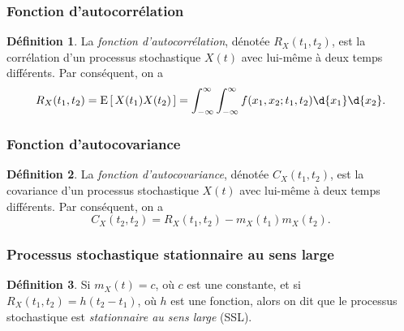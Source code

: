\documentclass[11pt]{article}
\makeatletter
\newcommand\Esp[1]{%
	\ensuremath{%
		\mathrm{E}\left[\,#1\,\right]%
	}%
}%
\theoremstyle{remark}
\theoremstyle{definition}
\newtheorem*{@definition}{Définition}
\newenvironment{definition}{%
	\begin{@definition}%
}{%
	\end{@definition}%
	\setcounter{property}{0}%
}
\makeatother
\begin{document}
\subsubsection{Fonction d'autocorrélation}
\begin{definition}
	La \textit{fonction d'autocorrélation}, dénotée $R_X(t_1,t_2)$, est la
	corrélation d'un processus stochastique $X(t)$ avec lui-même à deux temps
	différents. Par conséquent, on a
	\begin{equation*}
		R_X(t_1,t_2)
		=\Esp{X(t_1)X(t_2)}
		=\int_{-\infty}^\infty\int_{-\infty}^\infty
			f(x_1,x_2;t_1,t_2)\d{x_1}\d{x_2}.
	\end{equation*}
\end{definition}

\subsubsection{Fonction d'autocovariance}
\begin{definition}
	La \textit{fonction d'autocovariance}, dénotée $C_X(t_1,t_2)$, est la
	covariance d'un processus stochastique $X(t)$ avec lui-même à deux temps
	différents. Par conséquent, on a
	\begin{equation*}
		C_X(t_2,t_2)
		=R_X(t_1,t_2)-m_X(t_1)m_X(t_2).
	\end{equation*}
\end{definition}

\subsubsection{Processus stochastique stationnaire au sens large}
\begin{definition}
	Si $m_X(t)=c$, où $c$ est une constante, et si $R_X(t_1,t_2)=h(t_2-t_1)$, où
	$h$ est une fonction, alors on dit que le processus stochastique est
	\textit{stationnaire au sens large} (SSL).
\end{definition}
\end{document}
